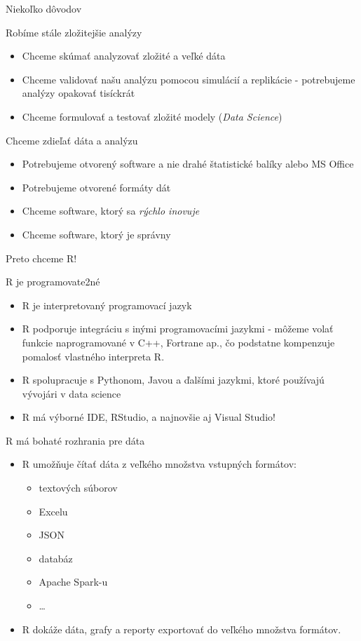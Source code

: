 \begin{frame}{Niekoľko dôvodov}
	\begin{block}{Robíme stále zložitejšie analýzy}
		\begin{itemize}
			\item Chceme skúmať analyzovať zložité a veľké dáta
			\item Chceme validovať našu analýzu pomocou simulácií a replikácie - potrebujeme analýzy opakovať tisíckrát
			\item Chceme formulovať a testovať zložité modely (\emph{Data Science})
		\end{itemize}
	\end{block}
	\begin{block}{Chceme zdieľať dáta a analýzu}
		\begin{itemize}
			\item Potrebujeme otvorený software a nie drahé štatistické balíky alebo MS Office
			\item Potrebujeme otvorené formáty dát
			\item Chceme software, ktorý sa \emph{rýchlo inovuje}
			\item Chceme software, ktorý je správny
		\end{itemize}
	\end{block}
\end{frame}

\begin{frame}{Preto chceme R!}
	\begin{block}{R je programovate2né}
		\begin{itemize}
			\item R je interpretovaný programovací jazyk
			\item R podporuje integráciu s inými programovacími jazykmi - môžeme volať funkcie naprogramované v C++, Fortrane ap., čo podstatne kompenzuje pomalosť vlastného interpreta R.
			\item R spolupracuje s Pythonom, Javou a ďalšími jazykmi, ktoré používajú vývojári v data science
			\item R má výborné IDE, RStudio, a najnovšie aj Visual Studio!
		\end{itemize}
	\end{block}
	\begin{block}{R má bohaté rozhrania pre dáta}
		\begin{itemize}
			\item R umožňuje čítať dáta z veľkého množstva vstupných formátov:
			\begin{itemize}
				\item textových súborov
				\item Excelu
				\item JSON
				\item databáz
				\item Apache Spark-u
				\item \dots
			\end{itemize}
			\item R dokáže dáta, grafy a reporty exportovať do veľkého množstva formátov.
		\end{itemize}
	\end{block}
\end{frame}

